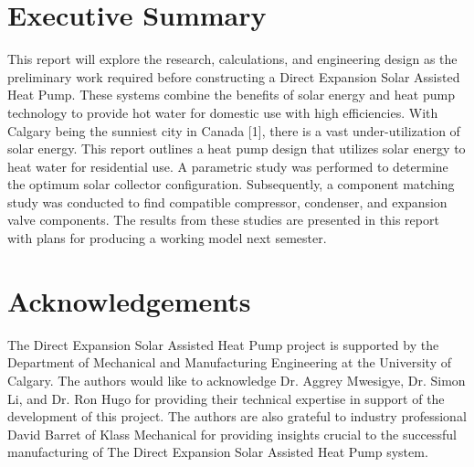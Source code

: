 \documentclass{ucalgarythesis}
\begin{document}
\frontmatter
\makethesistitle
\newpage


\chapter{Executive Summary}
This report will explore the research, calculations, and engineering design as the preliminary work required before constructing a Direct Expansion Solar Assisted Heat Pump. These systems combine the benefits of solar energy and heat pump technology to provide hot water for domestic use with high efficiencies. With Calgary being the sunniest city in Canada [1], there is a vast under-utilization of solar energy. This report outlines a heat pump design that utilizes solar energy to heat water for residential use. A parametric study was performed to determine the optimum solar collector configuration. Subsequently, a component matching study was conducted to find compatible compressor, condenser, and expansion valve components. The results from these studies are presented in this report with plans for producing a working model next semester.
\newpage

 
\chapter{Acknowledgements}  
The Direct Expansion Solar Assisted Heat Pump project is supported by the Department of Mechanical and Manufacturing Engineering at the University of Calgary. The authors would like to acknowledge Dr. Aggrey Mwesigye, Dr. Simon Li, and Dr. Ron Hugo for providing their technical expertise in support of the development of this project. The authors are also grateful to industry professional David Barret of Klass Mechanical for providing insights crucial to the successful manufacturing of The Direct Expansion Solar Assisted Heat Pump system.
\newpage

    
\tableofcontents
\newpage


\listoffigures
\newpage
\end{document}
